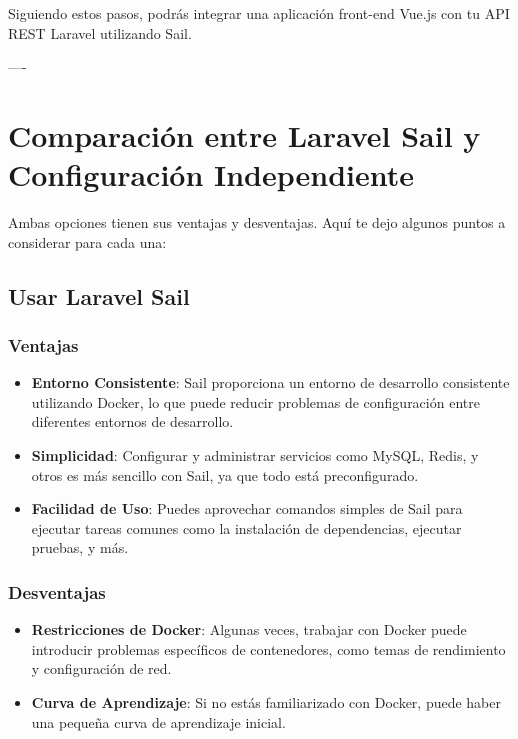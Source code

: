 \documentclass[11pt]{article}
\begin{document}
Siguiendo estos pasos, podrás integrar una aplicación front-end Vue.js
con tu API REST Laravel utilizando Sail.

----
\section{Comparación entre Laravel Sail y Configuración Independiente}
\label{sec:orgeb017fe}

Ambas opciones tienen sus ventajas y desventajas. Aquí te dejo algunos
puntos a considerar para cada una:

\subsection{Usar Laravel Sail}
\label{sec:orgb3c008b}

\subsubsection{Ventajas}
\label{sec:org970f3fa}
\begin{itemize}
\item \textbf{\textbf{Entorno Consistente}}: Sail proporciona un entorno de desarrollo
consistente utilizando Docker, lo que puede reducir problemas de
configuración entre diferentes entornos de desarrollo.
\item \textbf{\textbf{Simplicidad}}: Configurar y administrar servicios como MySQL,
Redis, y otros es más sencillo con Sail, ya que todo está
preconfigurado.
\item \textbf{\textbf{Facilidad de Uso}}: Puedes aprovechar comandos simples de Sail
para ejecutar tareas comunes como la instalación de dependencias,
ejecutar pruebas, y más.
\end{itemize}

\subsubsection{Desventajas}
\label{sec:orge0f5ae6}
\begin{itemize}
\item \textbf{\textbf{Restricciones de Docker}}: Algunas veces, trabajar con Docker
puede introducir problemas específicos de contenedores, como temas
de rendimiento y configuración de red.
\item \textbf{\textbf{Curva de Aprendizaje}}: Si no estás familiarizado con Docker,
puede haber una pequeña curva de aprendizaje inicial.
\end{itemize}
\end{document}
